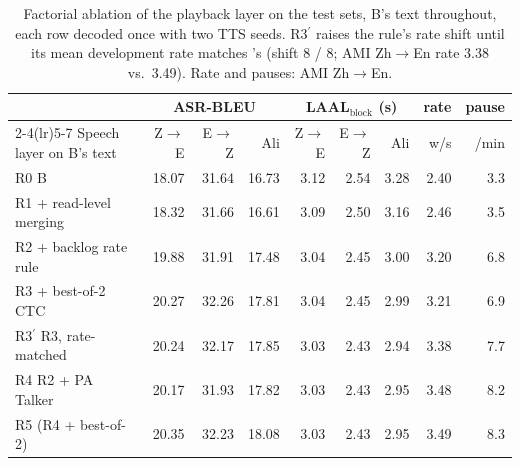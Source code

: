 \begin{table}[t]
\centering\scriptsize
\setlength{\tabcolsep}{2pt}
\begin{tabular}{lrrrrrrrr}
\toprule
 & \multicolumn{3}{c}{ASR-BLEU} & \multicolumn{3}{c}{LAAL$_\text{block}$ (s)} & rate & pause \\
\cmidrule(lr){2-4}\cmidrule(lr){5-7}
Speech layer on B's text & Z$\rightarrow$E & E$\rightarrow$Z & Ali & Z$\rightarrow$E & E$\rightarrow$Z & Ali & w/s & /min \\
\midrule
R0 B & 18.07 & 31.64 & 16.73 & 3.12 & 2.54 & 3.28 & 2.40 & 3.3 \\
R1 + read-level merging & 18.32 & 31.66 & 16.61 & 3.09 & 2.50 & 3.16 & 2.46 & 3.5 \\
R2 + backlog rate rule & 19.88 & 31.91 & 17.48 & 3.04 & 2.45 & 3.00 & 3.20 & 6.8 \\
R3 + best-of-2 CTC & 20.27 & 32.26 & 17.81 & 3.04 & 2.45 & 2.99 & 3.21 & 6.9 \\
R3$^\prime$ R3, rate-matched & 20.24 & 32.17 & 17.85 & 3.03 & 2.43 & 2.94 & 3.38 & 7.7 \\
R4 R2 + PA Talker & 20.17 & 31.93 & 17.82 & 3.03 & 2.43 & 2.95 & 3.48 & 8.2 \\
R5 \sys{} (R4 + best-of-2) & 20.35 & 32.23 & 18.08 & 3.03 & 2.43 & 2.95 & 3.49 & 8.3 \\
\bottomrule
\end{tabular}
\caption{Factorial ablation of the playback layer on the test sets, B's text throughout, each row decoded once with two TTS seeds. R3$^\prime$ raises the rule's rate shift until its mean development rate matches \sys{}'s (shift 8 / 8; AMI Zh$\rightarrow$En rate 3.38 vs.\ 3.49). Rate and pauses: AMI Zh$\rightarrow$En.}
\label{tab:factorial}
\end{table}
